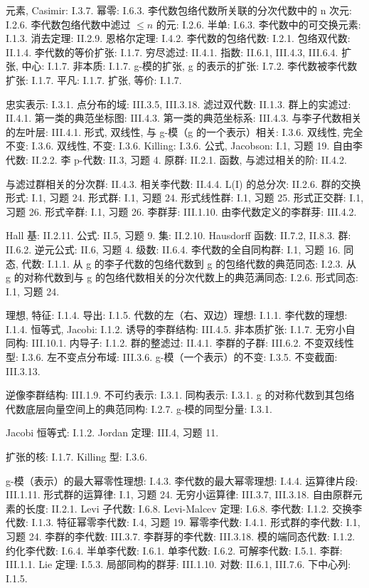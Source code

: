 元素, Casimir: I.3.7. 幂零: I.6.3. 李代数包络代数所关联的分次代数中的 n 次元: I.2.6. 李代数包络代数中滤过 \(\leqslant n\) 的元: I.2.6. 半单: I.6.3. 李代数中的可交换元素: I.1.3. 消去定理: II.2.9. 恩格尔定理: I.4.2. 李代数的包络代数: I.2.1. 包络双代数: II.1.4. 李代数的等价扩张: I.1.7. 穷尽滤过: II.4.1. 指数: II.6.1, III.4.3, III.6.4. 扩张, 中心: I.1.7. 非本质: I.1.7. g-模的扩张, g 的表示的扩张: I.7.2. 李代数被李代数扩张: I.1.7. 平凡: I.1.7. 扩张, 等价: I.1.7.

忠实表示: I.3.1. 点分布的域: III.3.5, III.3.18. 滤过双代数: II.1.3. 群上的实滤过: II.4.1. 第一类的典范坐标图: III.4.3. 第一类的典范坐标系: III.4.3. 与李子代数相关的左叶层: III.4.1. 形式, 双线性, 与 g-模（g 的一个表示）相关: I.3.6. 双线性, 完全不变: I.3.6. 双线性, 不变: I.3.6. Killing: I.3.6. 公式, Jacobson: I.1, 习题 19. 自由李代数: II.2.2. 李 p-代数: II.3, 习题 4. 原群: II.2.1. 函数, 与滤过相关的阶: II.4.2.

与滤过群相关的分次群: II.4.3. 相关李代数: II.4.4. L(I) 的总分次: II.2.6. 群的交换形式: I.1, 习题 24. 形式群: I.1, 习题 24. 形式线性群: I.1, 习题 25. 形式正交群: I.1, 习题 26. 形式辛群: I.1, 习题 26. 李群芽: III.1.10. 由李代数定义的李群芽: III.4.2.

Hall 基: II.2.11. 公式: II.5, 习题 9. 集: II.2.10. Hausdorff 函数: II.7.2, II.8.3. 群: II.6.2. 逆元公式: II.6, 习题 4. 级数: II.6.4. 李代数的全自同构群: I.1, 习题 16. 同态, 代数: I.1.1. 从 g 的李子代数的包络代数到 g 的包络代数的典范同态: I.2.3. 从 g 的对称代数到与 g 的包络代数相关的分次代数上的典范满同态: I.2.6. 形式同态: I.1, 习题 24.

理想, 特征: I.1.4. 导出: I.1.5. 代数的左（右、双边）理想: I.1.1. 李代数的理想: I.1.4. 恒等式, Jacobi: I.1.2. 诱导的李群结构: III.4.5. 非本质扩张: I.1.7. 无穷小自同构: III.10.1. 内导子: I.1.2. 群的整滤过: II.4.1. 李群的子群: III.6.2. 不变双线性型: I.3.6. 左不变点分布域: III.3.6. g-模（一个表示）的不变: I.3.5. 不变截面: III.3.13.

逆像李群结构: III.1.9. 不可约表示: I.3.1. 同构表示: I.3.1. g 的对称代数到其包络代数底层向量空间上的典范同构: I.2.7. g-模的同型分量: I.3.1.

Jacobi 恒等式: I.1.2. Jordan 定理: III.4, 习题 11.

扩张的核: I.1.7. Killing 型: I.3.6.

g-模（表示）的最大幂零性理想: I.4.3. 李代数的最大幂零理想: I.4.4. 运算律片段: III.1.11. 形式群的运算律: I.1, 习题 24. 无穷小运算律: III.3.7, III.3.18. 自由原群元素的长度: II.2.1. Levi 子代数: I.6.8. Levi-Malcev 定理: I.6.8. 李代数: I.1.2. 交换李代数: I.1.3. 特征幂零李代数: I.4, 习题 19. 幂零李代数: I.4.1. 形式群的李代数: I.1, 习题 24. 李群的李代数: III.3.7. 李群芽的李代数: III.3.18. 模的端同态代数: I.1.2. 约化李代数: I.6.4. 半单李代数: I.6.1. 单李代数: I.6.2. 可解李代数: I.5.1. 李群: III.1.1. Lie 定理: I.5.3. 局部同构的群芽: III.1.10. 对数: II.6.1, III.7.6. 下中心列: I.1.5.

